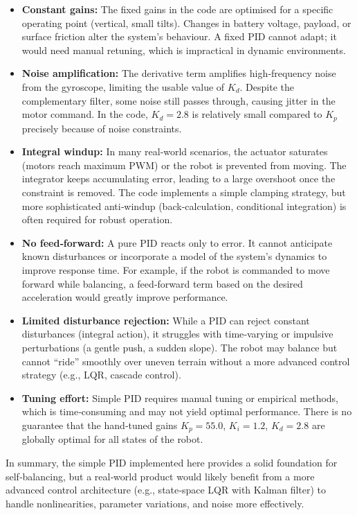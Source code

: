 \documentclass[12pt,a4paper]{article}
\begin{document}
\begin{enumerate}[leftmargin=*, label=\textbf{Q\arabic*}]
\begin{itemize}
			\item \textbf{Constant gains:} The fixed gains in the code are optimised 
			for a specific operating point (vertical, small tilts). Changes in battery 
			voltage, payload, or surface friction alter the system’s behaviour. A fixed 
			PID cannot adapt; it would need manual retuning, which is impractical in 
			dynamic environments.
			
			\item \textbf{Noise amplification:} The derivative term amplifies high‑frequency 
			noise from the gyroscope, limiting the usable value of $K_d$. Despite the 
			complementary filter, some noise still passes through, causing jitter in 
			the motor command. In the code, $K_d=2.8$ is relatively small compared to 
			$K_p$ precisely because of noise constraints.
			
			\item \textbf{Integral windup:} In many real‑world scenarios, the actuator 
			saturates (motors reach maximum PWM) or the robot is prevented from moving. 
			The integrator keeps accumulating error, leading to a large overshoot once 
			the constraint is removed. The code implements a simple clamping strategy, 
			but more sophisticated anti‑windup (back‑calculation, conditional 
			integration) is often required for robust operation.
			
			\item \textbf{No feed‑forward:} A pure PID reacts only to error. It cannot 
			anticipate known disturbances or incorporate a model of the system’s dynamics 
			to improve response time. For example, if the robot is commanded to move 
			forward while balancing, a feed‑forward term based on the desired 
			acceleration would greatly improve performance.
			
			\item \textbf{Limited disturbance rejection:} While a PID can reject 
			constant disturbances (integral action), it struggles with time‑varying or 
			impulsive perturbations (a gentle push, a sudden slope). The robot may 
			balance but cannot “ride” smoothly over uneven terrain without a more 
			advanced control strategy (e.g., LQR, cascade control).
			
			\item \textbf{Tuning effort:} Simple PID requires manual tuning or empirical 
			methods, which is time‑consuming and may not yield optimal performance. 
			There is no guarantee that the hand‑tuned gains $K_p=55.0$, $K_i=1.2$, 
			$K_d=2.8$ are globally optimal for all states of the robot.
		\end{itemize}
		
		In summary, the simple PID implemented here provides a solid foundation for 
		self‑balancing, but a real‑world product would likely benefit from a more 
		advanced control architecture (e.g., state‑space LQR with Kalman filter) to 
		handle nonlinearities, parameter variations, and noise more effectively.
		
	\end{enumerate}
	
\end{document}
